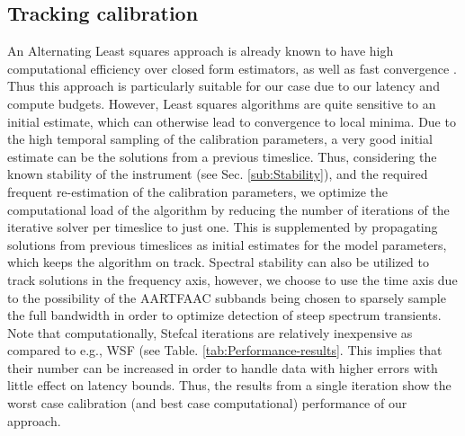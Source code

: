 \documentclass{aa}
\begin{document}
\subsection{Tracking calibration}

An  Alternating   Least  squares  approach   is  already  known  to   have  high
computational  efficiency   over  closed  form  estimators,  as   well  as  fast
convergence  \citep{boonstra2003gain}.   Thus   this  approach  is  particularly
suitable for  our case due to  our latency and compute  budgets.  However, Least
squares  algorithms  are quite  sensitive  to  an  initial estimate,  which  can
otherwise lead to convergence to local minima. Due to the high temporal sampling
of the calibration parameters, a very good initial estimate can be the solutions
from  a  previous timeslice.   Thus,  considering  the  known stability  of  the
instrument   (see  Sec.    \ref{sub:Stability}),  and   the   required  frequent
re-estimation of the calibration  parameters, we optimize the computational load
of the  algorithm by reducing the  number of iterations of  the iterative solver
per timeslice  to just one. This  is supplemented by  propagating solutions from
previous timeslices as  initial estimates for the model  parameters, which keeps
the  algorithm  on track.  Spectral  stability can  also  be  utilized to  track
solutions in the frequency axis, however, we  choose to use the time axis due to
the possibility  of the  AARTFAAC subbands being  chosen to sparsely  sample the
full  bandwidth in  order to  optimize detection  of steep  spectrum transients.
Note  that computationally,  Stefcal  iterations are  relatively inexpensive  as
compared to e.g.,  WSF (see Table. \ref{tab:Performance-results}. This implies that  their number can be
increased  in order  to handle  data with  higher errors  with little  effect on
latency bounds.  Thus, the results from  a single iteration show  the worst case
calibration (and best case computational) performance of our approach.
\end{document}
